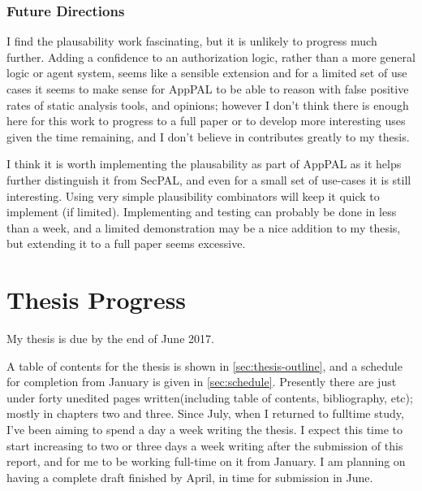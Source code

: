 \documentclass[a4paper]{scrartcl}
\newcommand{\new}[1]{{\color{BrickRed}#1}}
\begin{document}


\subsubsection*{Future Directions}

I find the plausability work fascinating, but it is unlikely to progress much
further.  Adding a confidence to an authorization logic, rather than a more
general logic or agent system, seems like a sensible extension and for a limited
set of use cases it seems to make sense for AppPAL to be able to reason with false
positive rates of static analysis tools, and opinions; however I don't think
there is enough here for this work to progress to a full paper or to develop
more interesting uses given the time remaining, and I don't believe in
contributes greatly to my thesis.

I think it is worth implementing the plausability as part of AppPAL as it helps
further distinguish it from SecPAL, and even for a small set of use-cases it is
still interesting.  Using very simple plausibility combinators will keep it
quick to implement (if limited).  Implementing and testing can probably be done
in less than a week, and a limited demonstration may be a nice addition to my
thesis, but extending it to a full paper seems excessive.

\section{Thesis Progress}
\label{sec:thesis}

My thesis is due by the end of June 2017.

A table of contents for the thesis is shown in \autoref{sec:thesis-outline}, and
a schedule for completion from January is given in \autoref{sec:schedule}.
Presently there are just under forty unedited pages written(including table of
contents, bibliography, etc); mostly in chapters two and three. Since July, when
I returned to fulltime study, I've been aiming to spend a day a week writing the
thesis. I expect this time to start increasing to two or three days a week
writing after the submission of this report, and for me to be working full-time
on it from January. I am planning on having a complete draft finished by April,
in time for submission in June.
\end{document}
